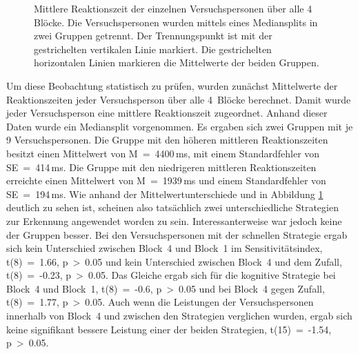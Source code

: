 \documentclass[doc,a4paper,12pt]{apa6}
\begin{document}
\begin{figure}[t]
  \centering
  \begin{minipage}{\textwidth}
    \vspace{10pt}
    \caption[Mittelwerte der Reaktionszeiten]{Mittlere Reaktionszeit der einzelnen Versuchspersonen über alle 4 Blöcke. Die Versuchspersonen wurden mittels eines Mediansplits in zwei Gruppen getrennt. Der Trennungspunkt ist mit der gestrichelten vertikalen Linie markiert. Die gestrichelten horizontalen Linien markieren die Mittelwerte der beiden Gruppen.}
    \label{strat}
  \end{minipage}
\end{figure}

Um diese Beobachtung statistisch zu prüfen, wurden zunächst Mittelwerte der Reaktionszeiten jeder Versuchsperson über alle 4~Blöcke berechnet. Damit wurde jeder Versuchsperson eine mittlere Reaktionszeit zugeordnet. Anhand dieser Daten wurde ein Mediansplit vorgenommen. Es ergaben sich zwei Gruppen mit je 9 Versuchspersonen. Die Gruppe mit den höheren mittleren Reaktionszeiten besitzt einen Mittelwert von M~=~4400\,ms, mit einem Standardfehler von SE~=~414\,ms. Die Gruppe mit den niedrigeren mittleren Reaktionszeiten erreichte einen Mittelwert von M~=~1939\,ms und einem Standardfehler von SE~=~194\,ms. Wie anhand der Mittelwertunterschiede und in Abbildung \ref{strat} deutlich zu sehen ist, scheinen also tatsächlich zwei unterschiedliche Strategien zur Erkennung angewendet worden zu sein. Interessanterweise war jedoch keine der Gruppen besser. Bei den Versuchspersonen mit der schnellen Strategie ergab sich kein Unterschied zwischen Block~4 und Block~1 im Sensitivitätsindex, t(8)~=~1.66, p~>~0.05 und kein Unterschied zwischen Block~4 und dem Zufall, t(8)~=~-0.23, p~>~0.05. Das Gleiche ergab sich für die kognitive Strategie bei Block~4 und Block~1, t(8)~=~-0.6, p~>~0.05 und bei Block~4 gegen Zufall, t(8)~=~1.77, p~>~0.05. Auch wenn die Leistungen der Versuchspersonen innerhalb von Block~4 und zwischen den Strategien verglichen wurden, ergab sich keine signifikant bessere Leistung einer der beiden Strategien, t(15)~=~-1.54, p~>~0.05.
\end{document}
